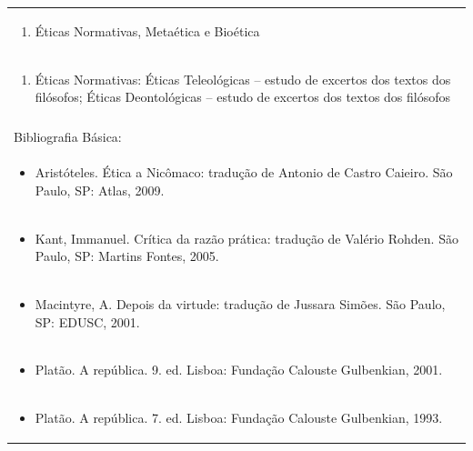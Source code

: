\documentclass[11pt]{article}
\begin{document}
\begin{center}
\begin{longtable}{|p{4cm}|p{4cm}|p{4cm}|p{4cm}|}
\multicolumn{4}{|p{\dimexpr 16cm + 6\tabcolsep\relax}|}{\begin{enumerate}[start=2]\item Éticas Normativas, Metaética e Bioética\end{enumerate}}\\
\multicolumn{4}{|p{\dimexpr 16cm + 6\tabcolsep\relax}|}{\begin{enumerate}[start=3]\item Éticas Normativas: Éticas Teleológicas – estudo de excertos dos textos dos filósofos; Éticas Deontológicas – estudo de excertos dos textos dos filósofos\end{enumerate}}\\
\multicolumn{4}{|p{\dimexpr 16cm + 6\tabcolsep\relax}|}{}\\
\hline
\multicolumn{4}{|p{16cm}|}{Bibliografia Básica:}\\*
\multicolumn{4}{|p{\dimexpr 16cm + 6\tabcolsep\relax}|}{\begin{itemize}\item Aristóteles. Ética a Nicômaco: tradução de Antonio de Castro Caieiro. São Paulo, SP: Atlas, 2009.\end{itemize}}\\
\multicolumn{4}{|p{\dimexpr 16cm + 6\tabcolsep\relax}|}{\begin{itemize}\item Kant, Immanuel. Crítica da razão prática: tradução de Valério Rohden. São Paulo, SP: Martins Fontes, 2005.\end{itemize}}\\
\multicolumn{4}{|p{\dimexpr 16cm + 6\tabcolsep\relax}|}{\begin{itemize}\item Macintyre, A. Depois da virtude: tradução de Jussara Simões. São Paulo, SP: EDUSC, 2001.\end{itemize}}\\
\multicolumn{4}{|p{\dimexpr 16cm + 6\tabcolsep\relax}|}{\begin{itemize}\item Platão. A república. 9. ed. Lisboa: Fundação Calouste Gulbenkian, 2001.\end{itemize}}\\
\multicolumn{4}{|p{\dimexpr 16cm + 6\tabcolsep\relax}|}{\begin{itemize}\item Platão. A república. 7. ed. Lisboa: Fundação Calouste Gulbenkian, 1993.\end{itemize}}\\

\end{longtable}
\end{center}
\end{document}
